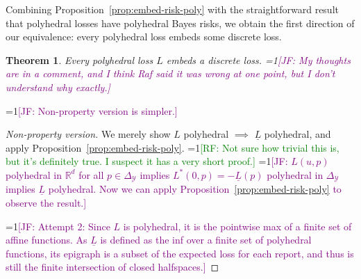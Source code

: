 \documentclass[12pt]{article}
\newcommand{\Comments}{1}
\newcommand{\mynote}[2]{\ifnum\Comments=1\textcolor{#1}{#2}\fi}
\newcommand{\raf}[1]{\mynote{green}{[RF: #1]}}
\newcommand{\jessie}[1]{\mynote{purple}{[JF: #1]}}
\newcommand{\reals}{\mathbb{R}}
\newcommand{\prop}[1]{\Gamma[#1]}
\newcommand{\simplex}{\Delta_\Y}
\newcommand{\R}{\mathcal{R}}
\newcommand{\Y}{\mathcal{Y}}
\newcommand{\risk}[1]{\underline{#1}}
\DeclareMathOperator*{\arginf}{arg\,inf}
\newtheorem{theorem}{Theorem}
\begin{document}
%
\hrulefill

Combining Proposition~\ref{prop:embed-risk-poly} with the straightforward result that polyhedral losses have polyhedral Bayes risks, we obtain the first direction of our equivalence: every polyhedral loss embeds some discrete loss.

\begin{theorem}\label{thm:poly-embeds-discrete}
  Every polyhedral loss $L$ embeds a discrete loss.
  \jessie{My thoughts are in a comment, and I think Raf said it was wrong at one point, but I don't understand why exactly.}
\end{theorem}
\jessie{Non-property version is simpler.}
\begin{proof}[Non-property version]
  We merely show $L$ polyhedral $\implies$ $\risk{L}$ polyhedral, and apply Proposition~\ref{prop:embed-risk-poly}.
  \raf{Not sure how trivial this is, but it's definitely true.  I suspect it has a very short proof.}
  \jessie{$L(u,p)$ polyhedral in $\reals^d$ for all $p \in \simplex$ implies $L^*(0,p) = -\risk{L}(p)$ polyhedral in $\simplex$ implies $\risk{L}$ polyhedral.
  Now we can apply Proposition~\ref{prop:embed-risk-poly} to observe the result.}
  
  \jessie{Attempt 2: Since $L$ is polyhedral, it is the pointwise max of a finite set of affine functions.  As $\risk{L}$ is defined as the inf over a finite set of polyhedral functions, its epigraph is a subset of the expected loss for each report, and thus is still the finite intersection of closed halfspaces.}
\end{proof}
%  
\end{document}
